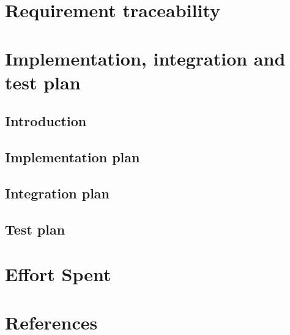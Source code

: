\chapter{Requirement traceability}
	
\chapter{Implementation, integration and test plan}
	\section{Introduction}
		
	\section{Implementation plan}
		
	\section{Integration plan}
		
	\section{Test plan}
		
\chapter{Effort Spent}
    
\chapter{References}


